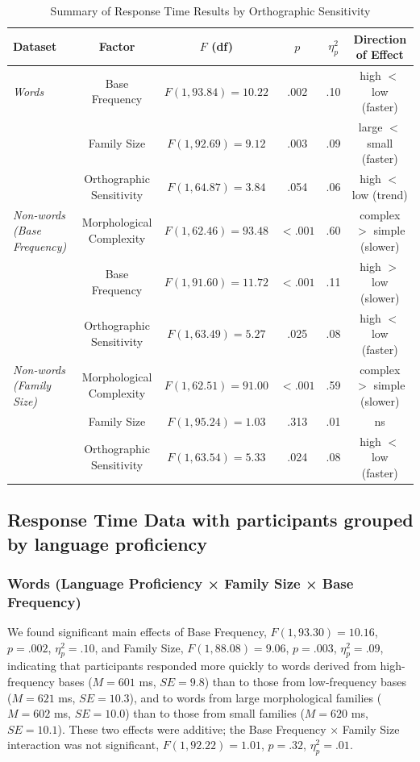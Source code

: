 \documentclass[preprint,12pt, authoryear, review]{elsarticle}
\begin{document}
	\begin{table}[ht]
		\centering
		\caption{Summary of Response Time Results by Orthographic Sensitivity}
		\begin{tabular}{lccccc}
			\toprule
			\textbf{Dataset} & \textbf{Factor} & \textbf{$F$ (df)} & \textbf{$p$} & \textbf{$\eta^2_p$} & \textbf{Direction of Effect} \\
			\midrule
			\textit{Words} & Base Frequency & $F(1, 93.84) = 10.22$ & .002 & .10 & high $<$ low (faster) \\
			& Family Size & $F(1, 92.69) = 9.12$ & .003 & .09 & large $<$ small (faster) \\
			& Orthographic Sensitivity & $F(1, 64.87) = 3.84$ & .054 & .06 & high $<$ low (trend) \\
			\midrule
			\textit{Non-words (Base Frequency)} & Morphological Complexity & $F(1, 62.46) = 93.48$ & $< .001$ & .60 & complex $>$ simple (slower) \\
			& Base Frequency & $F(1, 91.60) = 11.72$ & $< .001$ & .11 & high $>$ low (slower) \\
			& Orthographic Sensitivity & $F(1, 63.49) = 5.27$ & .025 & .08 & high $<$ low (faster) \\
			\midrule
			\textit{Non-words (Family Size)} & Morphological Complexity & $F(1, 62.51) = 91.00$ & $< .001$ & .59 & complex $>$ simple (slower) \\
			& Family Size & $F(1, 95.24) = 1.03$ & .313 & .01 & ns \\
			& Orthographic Sensitivity & $F(1, 63.54) = 5.33$ & .024 & .08 & high $<$ low (faster) \\
			\bottomrule
		\end{tabular}
	\end{table}

\subsection{Response Time Data with participants grouped by language proficiency}

	\subsubsection{Words (Language Proficiency × Family Size × Base Frequency) }
	
	We found significant main effects of Base Frequency, $F(1, 93.30) = 10.16$, $p = .002$, $\eta_p^2 = .10$, and Family Size, $F(1, 88.08) = 9.06$, $p = .003$, $\eta_p^2 = .09$, indicating that participants responded more quickly to words derived from high-frequency bases ($M = 601$ ms, $SE = 9.8$) than to those from low-frequency bases ($M = 621$ ms, $SE = 10.3$), and to words from large morphological families ($M = 602$ ms, $SE = 10.0$) than to those from small families ($M = 620$ ms, $SE = 10.1$). These two effects were additive; the Base Frequency × Family Size interaction was not significant, $F(1, 92.22) = 1.01$, $p = .32$, $\eta_p^2 = .01$. 
	
\end{document}
